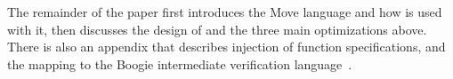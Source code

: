 
The remainder of the paper first introduces the Move language and how \MVP is used with it,
then discusses the design of \MVP and the three main optimizations above.
There is also an
appendix that describes
injection of function specifications, and the mapping to the
Boogie intermediate verification language~\cite{BOOGIE}.



